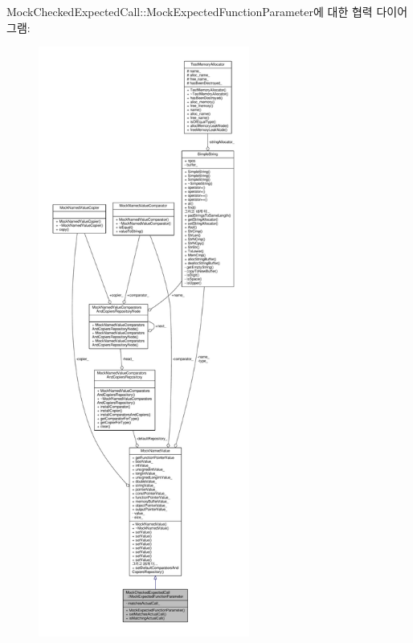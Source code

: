 Mock\+Checked\+Expected\+Call\+:\+:Mock\+Expected\+Function\+Parameter에 대한 협력 다이어그램\+:
\nopagebreak
\begin{figure}[H]
\begin{center}
\leavevmode
\includegraphics[height=550pt]{class_mock_checked_expected_call_1_1_mock_expected_function_parameter__coll__graph}
\end{center}
\end{figure}
